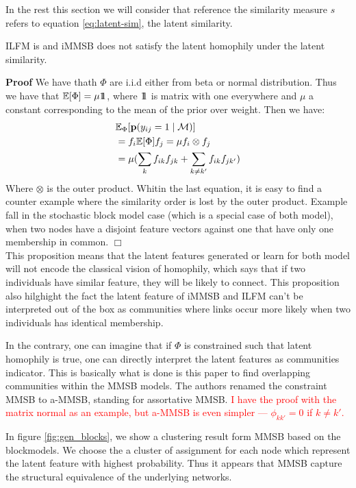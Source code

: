 In the rest this section we will consider that reference the similarity measure $s$ refers to equation \eqref{eq:latent-sim}, the latent similarity.

\begin{proposition}[]
	ILFM is and iMMSB does not satisfy the latent homophily under the latent similarity.
\end{proposition}

\noindent \textbf{Proof} We have thath $\Phi$ are i.i.d either from beta or normal distribution. Thus we have that $\mathbb{E}[\Phi] = \mu 1\!\!1$, where $1\!\!1$ is matrix with one everywhere and $\mu$ a constant corresponding to the mean of the prior over weight. Then we have:
%
\begin{align}
&\mathbb{E}_{\Phi}[\mathbf{p}(y_{ij}=1 \mid \mathcal{M})] \nonumber \\
&= f_i \mathbb{E}[\Phi]f_j = \mu f_i \otimes f_j  \nonumber \\
&= \mu (\sum_k f_{ik}f_{jk} + \sum_{k\neq k'} f_{ik}f_{jk'} ) \nonumber
\end{align}
%
Where $\otimes$ is the outer product. Whitin the last equation, it is easy to find a counter example where the similarity order is lost by the outer product. Example fall in the stochastic block model case (which is a special case of both model),  when two nodes have a disjoint feature vectors against one that have only one membership in common. \hfill $\Box$ \\

This proposition means that the latent features generated or learn for both model will not encode the classical vision of homophily, which says that if two individuals have similar feature, they will be likely to connect. This proposition also hilghight the fact the latent feature of iMMSB and ILFM can't be interpreted out of the box as communities where links occur more likely when two individuals has identical membership.

In the contrary, one can imagine that if $\Phi$ is constrained such that latent homophily is true, one can directly interpret the latent features as communities indicator. This is basically what is done is this paper \cite{AMMSB} to find overlapping communities within the MMSB models. The authors renamed the constraint MMSB to a-MMSB, standing for assortative MMSB. \textcolor{red}{I have the proof with the matrix normal as an example, but a-MMSB is even simpler --- $\phi_{kk'}=0$ if $k\neq k'$.}

In figure \ref{fig:gen_blocks}, we show a clustering result form MMSB based on the blockmodels. We choose the a cluster of assignment for each node which represent the latent feature with highest probability. Thus it appears that MMSB capture the structural equivalence of the underlying networks.

